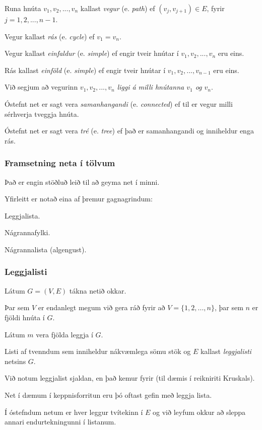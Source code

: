 {
	{
		\item<1-> Runa hnúta $v_1, v_2, ..., v_n$ kallast \emph{vegur} (e. \emph{path}) ef $(v_j, v_{j + 1}) \in E$, fyrir $j = 1, 2, ..., n - 1$.
		\item<2-> Vegur kallast \emph{rás} (e. \emph{cycle}) ef $v_1 = v_n$.
		\item<3-> Vegur kallast \emph{einfaldur} (e. \emph{simple}) ef engir tveir hnútar í $v_1, v_2, ..., v_n$ eru eins.
		\item<4-> Rás kallast \emph{einföld} (e. \emph{simple}) ef engir tveir hnútar í $v_1, v_2, ..., v_{n - 1}$ eru eins.
		\item<5-> Við segjum að vegurinn $v_1, v_2, ..., v_n$ \emph{liggi á milli hnútanna $v_1$ og $v_n$}.
		\item<6-> Óstefnt net er sagt vera \emph{samanhangandi} (e. \emph{connected}) ef til er vegur milli sérhverja tveggja hnúta.
		\item<7-> Óstefnt net er sagt vera \emph{tré} (e. \emph{tree}) ef það er samanhangandi og inniheldur enga rás.
	}
}
{
	\frametitle{Framsetning neta í tölvum}
	{
		\item<1-> Það er engin stöðluð leið til að geyma net í minni.
		\item<2-> Yfirleitt er notað eina af þremur gagnagrindum:
		{
			\item<3-> Leggjalista.
			\item<4-> Nágrannafylki.
			\item<5-> Nágrannalista (algengust).
		}
	}
}

{
	\frametitle{Leggjalisti}
	{
		\item<1-> Látum $G = (V, E)$ tákna netið okkar.
		\item<2-> Þar sem $V$ er endanlegt megum við gera ráð fyrir að $V = \{1, 2, ..., n\}$, þar sem $n$ er fjöldi hnúta í $G$.
		\item<3-> Látum $m$ vera fjölda leggja í $G$.
		\item<4-> Listi af tvenndum sem inniheldur nákvæmlega sömu stök og $E$ kallast \emph{leggjalisti} netsins $G$.
		\item<5-> Við notum leggjalist sjaldan, en það kemur fyrir (til dæmis í reikniriti Kruskals).
		\item<6-> Net í dæmum í keppnisforritun eru þó oftast gefin með leggja lista.
		\item<7-> Í óstefndum netum er hver leggur tvítekinn í $E$ og við leyfum okkur að sleppa annari endurtekningunni í listanum.
	}
}

